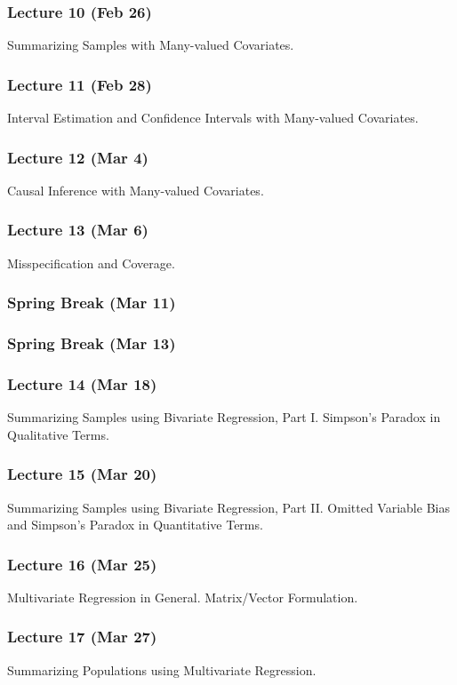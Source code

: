\documentclass[12pt]{article}
\begin{document}
\subsubsection*{Lecture 10 (Feb 26)}
Summarizing Samples with Many-valued Covariates.

\subsubsection*{Lecture 11 (Feb 28)}
Interval Estimation and Confidence Intervals with Many-valued Covariates.

\subsubsection*{Lecture 12 (Mar 4)}
Causal Inference with Many-valued Covariates.

\subsubsection*{Lecture 13 (Mar 6)}
Misspecification and Coverage.

\subsubsection*{Spring Break (Mar 11)}
\subsubsection*{Spring Break (Mar 13)}

\subsubsection*{Lecture 14 (Mar 18)}
Summarizing Samples using Bivariate Regression, Part I. Simpson's Paradox in Qualitative Terms.

\subsubsection*{Lecture 15 (Mar 20)}
Summarizing Samples using Bivariate Regression, Part II. Omitted Variable Bias and Simpson's Paradox in Quantitative Terms.

\subsubsection*{Lecture 16 (Mar 25)}
Multivariate Regression in General. Matrix/Vector Formulation.

\subsubsection*{Lecture 17 (Mar 27)}
Summarizing Populations using Multivariate Regression.
\end{document}
